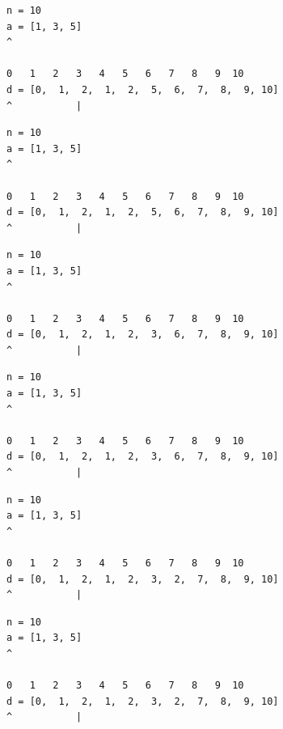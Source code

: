\begin{frame}[fragile]
\begin{verbatim}
n = 10
a = [1, 3, 5]
^

0   1   2   3   4   5   6   7   8   9  10
d = [0,  1,  2,  1,  2,  5,  6,  7,  8,  9, 10]
^           |
\end{verbatim}
\end{frame}
\addtocounter{framenumber}{-1}

\begin{frame}[fragile]
\begin{verbatim}
n = 10
a = [1, 3, 5]
^

0   1   2   3   4   5   6   7   8   9  10
d = [0,  1,  2,  1,  2,  5,  6,  7,  8,  9, 10]
^           |
\end{verbatim}
\end{frame}
\addtocounter{framenumber}{-1}

\begin{frame}[fragile]
\begin{verbatim}
n = 10
a = [1, 3, 5]
^

0   1   2   3   4   5   6   7   8   9  10
d = [0,  1,  2,  1,  2,  3,  6,  7,  8,  9, 10]
^           |
\end{verbatim}
\end{frame}
\addtocounter{framenumber}{-1}

\begin{frame}[fragile]
\begin{verbatim}
n = 10
a = [1, 3, 5]
^

0   1   2   3   4   5   6   7   8   9  10
d = [0,  1,  2,  1,  2,  3,  6,  7,  8,  9, 10]
^           |
\end{verbatim}
\end{frame}
\addtocounter{framenumber}{-1}

\begin{frame}[fragile]
\begin{verbatim}
n = 10
a = [1, 3, 5]
^

0   1   2   3   4   5   6   7   8   9  10
d = [0,  1,  2,  1,  2,  3,  2,  7,  8,  9, 10]
^           |
\end{verbatim}
\end{frame}
\addtocounter{framenumber}{-1}

\begin{frame}[fragile]
\begin{verbatim}
n = 10
a = [1, 3, 5]
^

0   1   2   3   4   5   6   7   8   9  10
d = [0,  1,  2,  1,  2,  3,  2,  7,  8,  9, 10]
^           |
\end{verbatim}
\end{frame}
\addtocounter{framenumber}{-1}

